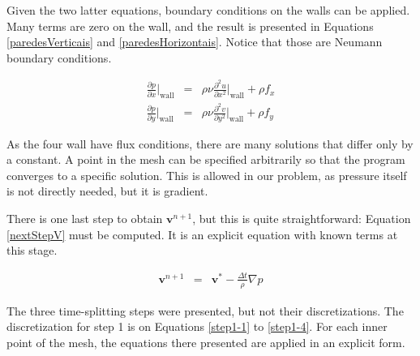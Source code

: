 \documentclass[journal]{IEEEtran}
\begin{document}
Given the two latter equations, boundary conditions on the walls can be applied. Many terms are zero on the wall, and the result is presented in Equations \ref{paredesVerticais} and \ref{paredesHorizontais}. Notice that those are Neumann boundary conditions.

\begin{eqnarray}
\frac{\partial p}{\partial x}\Bigg|_{\textrm{wall}}&=&\rho\nu\frac{\partial^2
u}{\partial x^2}\Bigg|_{\textrm{wall}}+\rho f_x\label{paredesVerticais}\\
\frac{\partial p}{\partial y}\Bigg|_{\textrm{wall}}&=&\rho\nu\frac{\partial^2
v}{\partial y^2}\Bigg|_{\textrm{wall}}+\rho f_y\label{paredesHorizontais}
\end{eqnarray}

As the four wall have flux conditions, there are many solutions that differ only by a constant. A point in the mesh can be specified arbitrarily so that the program converges to a specific solution. This is allowed in our problem, as pressure itself is not directly needed, but it is gradient.

There is one last step to obtain $\mathbf{v}^{n+1}$, but this is quite straightforward: Equation \ref{nextStepV} must be computed. It is an explicit equation with known terms at this stage.

\begin{eqnarray}
	\mathbf{v}^{n+1} & = & \mathbf{v}^*  - \frac{\Delta t}{\rho} \nabla p \label{nextStepV}
\end{eqnarray}

The three time-splitting steps were presented, but not their discretizations. The discretization for step 1 is on Equations \ref{step1-1} to \ref{step1-4}. For each inner point of the mesh, the equations there presented are applied in an explicit form.
\end{document}
